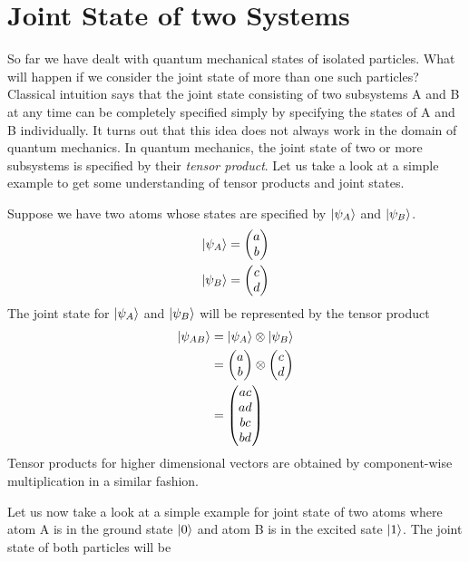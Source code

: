 \section{Joint State of two Systems}
\par So far we have dealt with quantum mechanical states of isolated particles. What will happen if we consider the joint state of more than one such particles? Classical intuition says that the joint state consisting of two subsystems A and B at any time can be completely specified simply by specifying the states of A and B individually. It turns out that this idea does not always work in the domain of quantum mechanics. In quantum mechanics, the joint state of two or more subsystems is specified by their \textit{tensor product}. Let us take a look at a simple example to get some understanding of tensor products and joint states.
\par Suppose we have two atoms whose states are specified by $\ket{\psi_A}$ and $\ket{\psi_B}$.
\begin{align*}
  \ket{\psi_A} = \begin{pmatrix} a \\ b \end{pmatrix} \\
  \ket{\psi_B} = \begin{pmatrix} c \\ d \end{pmatrix}
\end{align*}
The joint state for $\ket{\psi_A}$ and $\ket{\psi_B}$ will be represented by the tensor product
\begin{align*}
  \ket{\psi_{AB}} &= \ket{\psi_A} \otimes \ket{\psi_B} \\
                &= \begin{pmatrix} a \\ b \end{pmatrix} \otimes \begin{pmatrix} c \\ d \end{pmatrix} \\
                &= \begin{pmatrix} ac \\ ad \\ bc \\ bd \end{pmatrix}
\end{align*}
Tensor products for higher dimensional vectors are obtained by component-wise multiplication in a similar fashion.
\par Let us now take a look at a simple example for joint state of two atoms where atom A is in the ground state $\ket{0}$ and atom B is in the excited sate $\ket{1}$. The joint state of both particles will be
